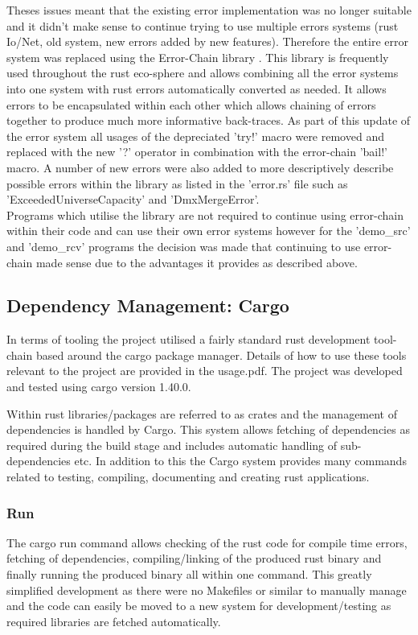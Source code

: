 \documentclass[11pt,a4paper]{article}
\begin{document}
Theses issues meant that the existing error implementation was no longer suitable and it didn't make sense to continue trying to use multiple errors systems (rust Io/Net, old system, new errors added by new features). Therefore the entire error system was replaced using the Error-Chain library \cite{ERROR_CHAIN}. This library is frequently used throughout the rust eco-sphere and allows combining all the error systems into one system with rust errors automatically converted as needed. It allows errors to be encapsulated within each other which allows chaining of errors together to produce much more informative back-traces. As part of this update of the error system all usages of the depreciated 'try!' macro were removed and replaced with the new '?' operator in combination with the error-chain 'bail!' macro. A number of new errors were also added to more descriptively describe possible errors within the library as listed in the 'error.rs' file such as 'ExceededUniverseCapacity' and 'DmxMergeError'. \\

Programs which utilise the library are not required to continue using error-chain within their code and can use their own error systems however for the 'demo\_src' and 'demo\_rcv' programs the decision was made that continuing to use error-chain made sense due to the advantages it provides as described above.

\subsection{Dependency Management: Cargo}
In terms of tooling the project utilised a fairly standard rust development tool-chain based around the cargo package manager. Details of how to use these tools relevant to the project are provided in the usage.pdf. The project was developed and tested using cargo version 1.40.0.

Within rust libraries/packages are referred to as crates and the management of dependencies is handled by Cargo. This system allows fetching of dependencies as required during the build stage and includes automatic handling of sub-dependencies etc. In addition to this the Cargo system provides many commands related to testing, compiling, documenting and creating rust applications.

\subsubsection{Run}
The cargo run command allows checking of the rust code for compile time errors, fetching of dependencies, compiling/linking of the produced rust binary and finally running the produced binary all within one command. This greatly simplified development as there were no Makefiles or similar to manually manage and the code can easily be moved to a new system for development/testing as required libraries are fetched automatically.
\end{document}
